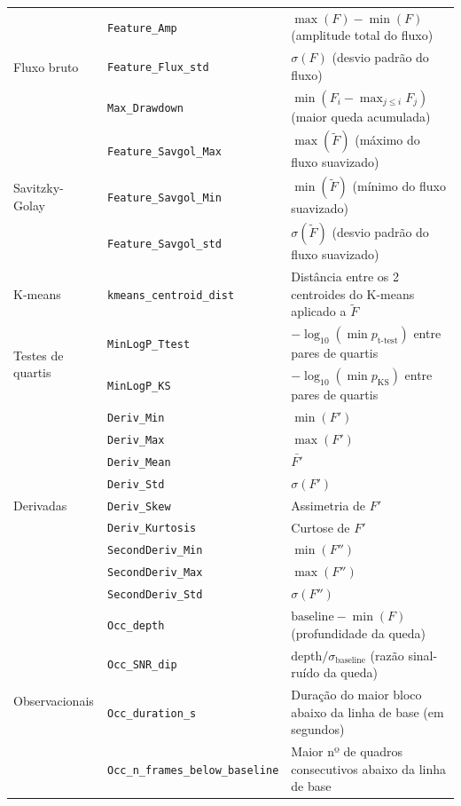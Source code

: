 \documentclass[msc]{on} %
\begin{document}
\begin{table}[htbp]
\begin{tabular}{llp{7.1cm}}
\hline
\multirow{3}{*}{Fluxo bruto}
& \texttt{Feature\_Amp} & $\max(F) - \min(F)$ (amplitude total do fluxo) \\
& \texttt{Feature\_Flux\_std} & $\sigma(F)$ (desvio padrão do fluxo) \\
& \texttt{Max\_Drawdown} & $\min(F_i - \max_{j \le i} F_j)$ (maior queda acumulada) \\
\hline
\multirow{3}{*}{Savitzky-Golay}
& \texttt{Feature\_Savgol\_Max} & $\max(\tilde{F})$ (máximo do fluxo suavizado) \\
& \texttt{Feature\_Savgol\_Min} & $\min(\tilde{F})$ (mínimo do fluxo suavizado) \\
& \texttt{Feature\_Savgol\_std} & $\sigma(\tilde{F})$ (desvio padrão do fluxo suavizado) \\
\hline
K-means & \texttt{kmeans\_centroid\_dist} & Distância entre os 2 centroides do K-means aplicado a $\tilde{F}$ \\
\hline
\multirow{2}{*}{Testes de quartis}
& \texttt{MinLogP\_Ttest} & $-\log_{10}(\min p_{\text{t-test}})$ entre pares de quartis \\
& \texttt{MinLogP\_KS} & $-\log_{10}(\min p_{\text{KS}})$ entre pares de quartis \\
\hline
\multirow{9}{*}{Derivadas}
& \texttt{Deriv\_Min} & $\min(F')$ \\
& \texttt{Deriv\_Max} & $\max(F')$ \\
& \texttt{Deriv\_Mean} & $\bar{F'}$ \\
& \texttt{Deriv\_Std} & $\sigma(F')$ \\
& \texttt{Deriv\_Skew} & Assimetria de $F'$ \\
& \texttt{Deriv\_Kurtosis} & Curtose de $F'$ \\
& \texttt{SecondDeriv\_Min} & $\min(F'')$ \\
& \texttt{SecondDeriv\_Max} & $\max(F'')$ \\
& \texttt{SecondDeriv\_Std} & $\sigma(F'')$ \\
\hline
\multirow{10}{*}{Observacionais}
& \texttt{Occ\_depth} & $\text{baseline} - \min(F)$ (profundidade da queda) \\
& \texttt{Occ\_SNR\_dip} & $\text{depth}/\sigma_{\text{baseline}}$ (razão sinal-ruído da queda) \\
& \texttt{Occ\_duration\_s} & Duração do maior bloco abaixo da linha de base (em segundos) \\
& \texttt{Occ\_n\_frames\_below\_baseline} & Maior nº de quadros consecutivos abaixo da linha de base \\

\end{tabular}
\end{table}
\end{document}
